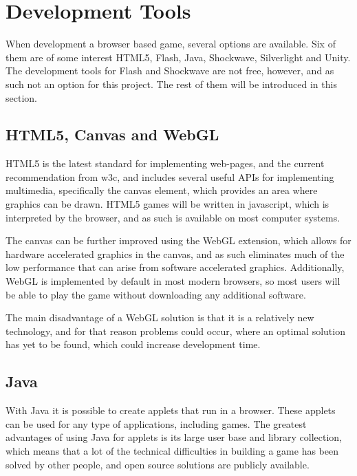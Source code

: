 \section{Development Tools}

\label{sec:tools}

When development a browser based game, several options are available. Six of them are of some interest
HTML5, Flash, Java, Shockwave, Silverlight and Unity. The development tools for Flash and Shockwave are not free, \cite{adobe13} however,
and as such not an option for this project. The rest of them will be introduced in this section.

\subsection{HTML5, Canvas and WebGL}
HTML5 is the latest standard for implementing web-pages, and the current recommendation from \ac{w3c}, \cite{html513} and includes several
useful APIs for implementing multimedia, specifically the canvas element, which provides an area where graphics can be drawn.
HTML5 games will be written in javascript, which is interpreted by the browser, and as such is available on most computer systems.

The canvas can be further improved using the WebGL extension,\cite{khronos13} which allows for hardware accelerated graphics in the canvas,
and as such eliminates much of the low performance that can arise from software accelerated graphics.
Additionally, WebGL is implemented by default in most modern browsers, so most users will be able to play the game
without downloading any additional software.

The main disadvantage of a WebGL solution is that it is a relatively new technology, and for that reason problems could occur, where an optimal solution has yet to be found, which could increase development time.

\subsection{Java}
With Java it is possible to create applets that run in a browser.\cite{java13} These applets can be used for any type of applications,
including games. The greatest advantages of using Java for applets is its large user base and library collection, which means that a lot of the technical difficulties in building a game has been solved by other people,
and open source solutions are publicly available.

